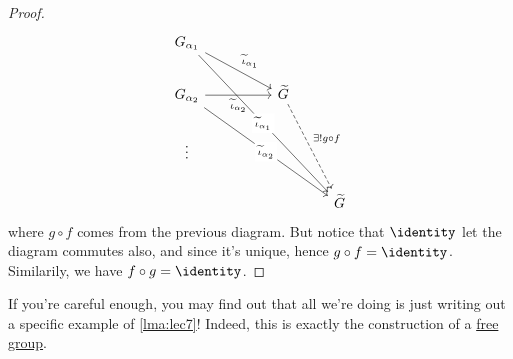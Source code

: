 \begin{remark}
\begin{proof}
\[\begin{tikzcd}
				{G_{\alpha_1}} \\
				{G_{\alpha_2}} && {\widetilde{G}} \\
				\vdots \\
				&&& {\widetilde{G}}
				\arrow["{\widetilde{\iota}_{\alpha_1}}", from=1-1, to=2-3]
				\arrow["{\widetilde{\iota}_{\alpha_2}}"', from=2-1, to=2-3]
				\arrow["{\exists ! g\circ f}", dashed, from=2-3, to=4-4]
				\arrow["{\widetilde{\iota}_{\alpha_1}}"{description}, from=1-1, to=4-4]
				\arrow["{\widetilde{\iota}_{\alpha_2}}"{description}, from=2-1, to=4-4]
			\end{tikzcd}
		\]
		where \(g\circ f\) comes from the previous diagram. But notice that \(\identity_{} \) let the diagram commutes also, and since it's unique, hence \(g\circ f = \identity_{} \). Similarily,
		we have \(f\circ g = \identity_{} \).
	\end{proof}
\end{remark}

If you're careful enough, you may find out that all we're doing is just writing out a specific example of \autoref{lma:lec7}! Indeed, this is exactly the construction of a
\hyperref[def:free-group]{free group}.

